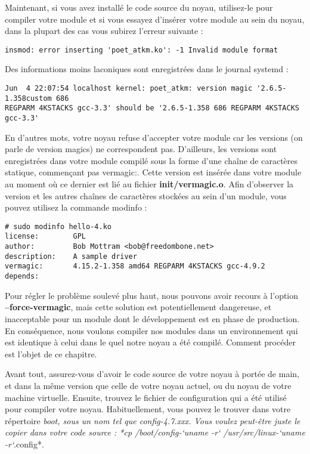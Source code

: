 \documentclass[11pt]{article}
\begin{document}
Maintenant, si vous avez installé le code source du noyau, utilisez-le pour compiler votre module et si vous essayez d'insérer votre module au sein du noyau, dans la plupart des cas vous subirez l'erreur suivante :

\begin{verbatim}
insmod: error inserting 'poet_atkm.ko': -1 Invalid module format
\end{verbatim}

Des informations moins laconiques sont enregistrées dans le journal systemd :

\begin{verbatim}
Jun  4 22:07:54 localhost kernel: poet_atkm: version magic '2.6.5-1.358custom 686
REGPARM 4KSTACKS gcc-3.3' should be '2.6.5-1.358 686 REGPARM 4KSTACKS gcc-3.3'
\end{verbatim}

En d'autres mots, votre noyau refuse d'accepter votre module car les versions (on parle de version magics) ne correspondent pas. D'ailleurs, les versions sont enregistrées dans votre module compilé sous la forme d'une chaîne de caractères statique, commençant pas vermagic:. Cette version est insérée dans votre module au moment où ce dernier est lié au fichier \textbf{init/vermagic.o}. Afin d'observer la version et les autres chaînes de caractères stockées au sein d'un module, vous pouvez utilisez la commande modinfo :

\begin{verbatim}
# sudo modinfo hello-4.ko
license:        GPL
author:         Bob Mottram <bob@freedombone.net>
description:    A sample driver
vermagic:       4.15.2-1.358 amd64 REGPARM 4KSTACKS gcc-4.9.2
depends:
\end{verbatim}

Pour régler le problème soulevé plus haut, nous pouvons avoir recours à l'option \textbf{--force-vermagic}, mais cette solution est potentiellement dangereuse, et inacceptable pour un module dont le développement est en phase de production. En conséquence, nous voulons compiler nos modules dans un environnement qui est identique à celui dans le quel notre noyau a été compilé. Comment procéder est l'objet de ce chapitre.

Avant tout, assurez-vous d'avoir le code source de votre noyau à portée de main, et dans la même version que celle de votre noyau actuel, ou du noyau de votre machine virtuelle. Ensuite, trouvez le fichier de configuration qui a été utilisé pour compiler votre noyau. Habituellement, vous pouvez le trouver dans votre répertoire \emph{boot, sous un nom tel que config-4.7.xxx. Vous voulez peut-être juste le copier dans votre code source : *cp /boot/config-`uname -r` /usr/src/linux-`uname -r`}.config*.
\end{document}
